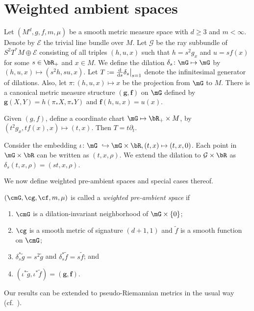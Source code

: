 \section{Weighted ambient spaces}
\label{sec:fg}

Let $(M^d,g,f,m,\mu)$ be a smooth metric measure space with $d\geq 3$ and $m<\infty$. Denote by $\mathcal{E}$ the trivial line bundle over $M$. Let $\mathcal{G}$ be the ray subbundle of $S^2 T^*M\oplus \mathcal{E}$ consisting of all triples $(h,u,x)$ such that $h=s^2 g_x$ and $u=sf(x)$ for some $s\in \bR_+$ and $x\in M$. We define the dilation $\delta_s\colon \mG \mapsto \mG$ by $(h,u,x)\mapsto (s^2 h,su,x)$. Let $T:=\frac{{\rm d}}{{\rm d}s}\delta_s\big|_{s=1}$ denote the infinitesimal generator of dilations. Also, let $\pi \colon (h,u,x) \mapsto x$ be the projection from $\mG$ to $M$. There is a canonical metric measure structure $(\boldsymbol{g},\boldsymbol{f})$ on $\mG$ defined by $\boldsymbol{g}(X,Y)=h(\pi_*X,\pi_*Y)$ and $\boldsymbol{f}(h,u,x)=u(x)$.

Given $(g,f)$, define a coordinate chart $\mG\mapsto \bR_+\times M$, by $(t^2g_x,tf(x),x)\mapsto (t,x)$. Then $T=t\partial_t$.

Consider the embedding $\iota \colon \mG\ \hookrightarrow \mG\times\bR,(t,x)\mapsto (t,x,0)$. Each point in $\mG\times\bR$ can be written as $(t,x,\rho)$. We extend the dilation to $\mathcal{G}\times \bR$ as $\delta_s (t,x,\rho)= (st,x,\rho)$.

We now define weighted pre-ambient spaces and special cases thereof.

\begin{Definition}
$(\cmG,\cg,\cf,m,\mu)$ is called a \emph{weighted pre-ambient space} if
\begin{enumerate}[label=$(\roman*)$]\itemsep=0pt
 \item $\cmG$ is a dilation-invariant neighborhood of $\mG\times \{0\}$;
 \item $\cg$ is a smooth metric of signature $(d+1,1)$ and $\widetilde{f}$ is a smooth function on $\cmG$;
 \item $\delta_s^*\widetilde{g}=s^2 \widetilde{g}$ and $\delta_s^*\widetilde{f}=s\widetilde{f}$; and
 \item $(\iota^*\widetilde{g},\iota^*\widetilde{f})=(\boldsymbol{g},\boldsymbol{f})$.
\end{enumerate}
\end{Definition}

\begin{Remark}
Our results can be extended to pseudo-Riemannian metrics in the usual way (cf.~\cite{FeffermanGraham2012}).
\end{Remark}

